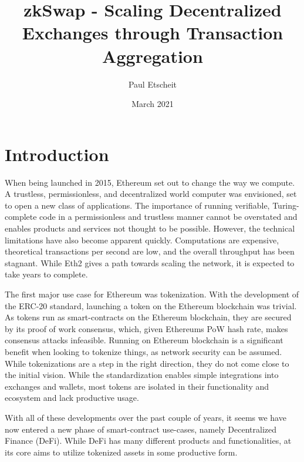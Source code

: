 \documentclass[11pt,twoside,a4paper,final]{book}
\title{zkSwap - Scaling Decentralized Exchanges through Transaction Aggregation}
\author{Paul Etscheit}
\date{March 2021}
\begin{document}
\begin{titlepage}
\maketitle
\end{titlepage}

\section{Introduction}
When being launched in 2015, Ethereum \cite{wood2014ethereum} set out to change the way we compute. A trustless, permissionless, and decentralized world computer was envisioned, set to open a new class of applications. The importance of running verifiable, Turing-complete code in a permissionless and trustless manner cannot be overstated and enables products and services not thought to be possible. However, the technical limitations have also become apparent quickly. Computations are expensive, theoretical transactions per second are low, and the overall throughput has been stagnant. While Eth2 gives a path towards scaling the network, it is expected to take years to complete. 

The first major use case for Ethereum was tokenization. With the development of the ERC-20 standard, launching a token on the Ethereum blockchain was trivial. As tokens run as smart-contracts on the Ethereum blockchain, they are secured by its proof of work consensus, which, given Ethereums PoW hash rate, makes consensus attacks infeasible. Running on Ethereum blockchain is a significant benefit when looking to tokenize things, as network security can be assumed. While tokenizations are a step in the right direction, they do not come close to the initial vision. While the standardization enables simple integrations into exchanges and wallets, most tokens are isolated in their functionality and ecosystem and lack productive usage.

With all of these developments over the past couple of years, it seems we have now entered a new phase of smart-contract use-cases, namely Decentralized Finance (DeFi). While DeFi has many different products and functionalities, at its core aims to utilize tokenized assets in some productive form. 
\end{document}
